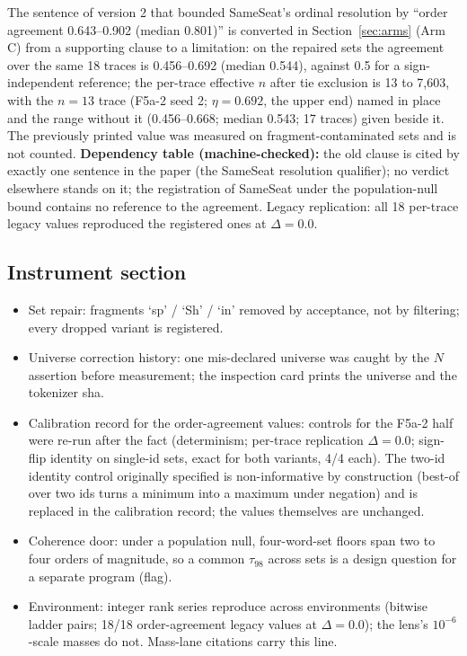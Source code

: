 \documentclass[11pt]{article}
\begin{document}
The sentence of version 2 that bounded SameSeat's ordinal resolution by
``order agreement 0.643--0.902 (median 0.801)'' is converted in
Section~\ref{sec:arms} (Arm C) from a supporting clause to a limitation:
on the repaired sets the agreement over the same 18 traces is 0.456--0.692
(median 0.544), against 0.5 for a sign-independent reference; the per-trace
effective $n$ after tie exclusion is 13 to 7{,}603, with the $n = 13$ trace
(F5a-2 seed 2; $\eta = 0.692$, the upper end) named in place and the range
without it (0.456--0.668; median 0.543; 17 traces) given beside it. The
previously printed value was measured on fragment-contaminated sets and is
not counted. \textbf{Dependency table (machine-checked):} the old clause is
cited by exactly one sentence in the paper (the SameSeat resolution
qualifier); no verdict elsewhere stands on it; the registration of SameSeat
under the population-null bound contains no reference to the agreement.
Legacy replication: all 18 per-trace legacy values reproduced the registered
ones at $\Delta = 0.0$.

\subsection*{Instrument section}

\begin{itemize}\itemsep2pt
\item Set repair: fragments `sp' / `Sh' / `in' removed by acceptance, not
by filtering; every dropped variant is registered.
\item Universe correction history: one mis-declared universe was caught by
the $N$ assertion before measurement; the inspection card prints the
universe and the tokenizer sha.
\item Calibration record for the order-agreement values: controls for the
F5a-2 half were re-run after the fact (determinism; per-trace replication
$\Delta = 0.0$; sign-flip identity on single-id sets, exact for both
variants, 4/4 each). The two-id identity control originally specified is
non-informative by construction (best-of over two ids turns a minimum into
a maximum under negation) and is replaced in the calibration record; the
values themselves are unchanged.
\item Coherence door: under a population null, four-word-set floors span
two to four orders of magnitude, so a common $\tau_{98}$ across sets is a
design question for a separate program (flag).
\item Environment: integer rank series reproduce across environments
(bitwise ladder pairs; 18/18 order-agreement legacy values at
$\Delta = 0.0$); the lens's $10^{-6}$-scale masses do not. Mass-lane
citations carry this line.
\end{itemize}
\end{document}
